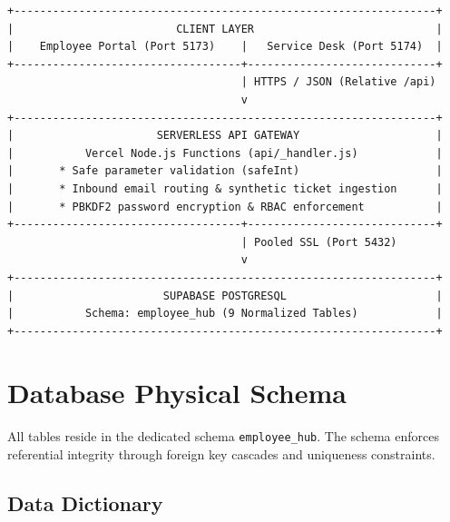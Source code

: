 \documentclass[a4paper,11pt]{article}
\begin{document}
\begin{center}
\begin{tcolorbox}[colback=white,colframe=branddark,arc=2mm,boxrule=0.8pt,width=0.98\textwidth]
\centering
\small
\begin{verbatim}
+-----------------------------------------------------------------+
|                         CLIENT LAYER                            |
|    Employee Portal (Port 5173)    |   Service Desk (Port 5174)  |
+-----------------------------------+-----------------------------+
                                    | HTTPS / JSON (Relative /api)
                                    v
+-----------------------------------------------------------------+
|                      SERVERLESS API GATEWAY                     |
|           Vercel Node.js Functions (api/_handler.js)            |
|       * Safe parameter validation (safeInt)                     |
|       * Inbound email routing & synthetic ticket ingestion      |
|       * PBKDF2 password encryption & RBAC enforcement           |
+-----------------------------------+-----------------------------+
                                    | Pooled SSL (Port 5432)
                                    v
+-----------------------------------------------------------------+
|                       SUPABASE POSTGRESQL                       |
|           Schema: employee_hub (9 Normalized Tables)            |
+-----------------------------------------------------------------+
\end{verbatim}
\end{tcolorbox}
\end{center}

\section{Database Physical Schema}

All tables reside in the dedicated schema \texttt{employee\_hub}. The schema enforces referential integrity through foreign key cascades and uniqueness constraints.

\subsection{Data Dictionary}
\end{document}
